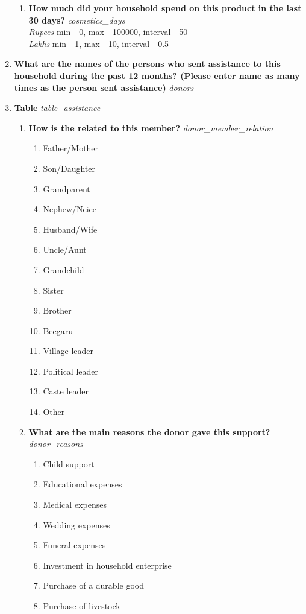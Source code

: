 \documentclass{article}
\begin{document}
\begin{enumerate}
\begin{enumerate}[label*=\arabic*.]
\item {\bfseries How much did your household spend on this product in the last 30 days?}\emph{ cosmetics\_days }
\\ \emph{ Rupees }min - 0, max - 100000, interval - 50
\\ \emph{ Lakhs }min - 1, max - 10, interval - 0.5

\end{enumerate}
\item {\bfseries What are the names of the persons who sent assistance to this household during the past 12 months? (Please enter name as many times as the person sent assistance)}\emph{ donors }

\item {\bfseries Table}\emph{ table\_assistance }
\begin{enumerate}[label*=\arabic*.]
\item {\bfseries How is the related to this member?}\emph{ donor\_member\_relation }
\begin{enumerate}
\item Father/Mother
\item Son/Daughter
\item Grandparent
\item Nephew/Neice
\item Husband/Wife
\item Uncle/Aunt
\item Grandchild
\item Sister
\item Brother
\item Beegaru
\item Village leader
\item Political leader
\item Caste leader
\item Other
\end{enumerate}
\item {\bfseries What are the main reasons the donor gave this support?}\emph{ donor\_reasons }
\begin{enumerate}
\item Child support
\item Educational expenses
\item Medical expenses
\item Wedding expenses
\item Funeral expenses
\item Investment in household enterprise
\item Purchase of a durable good
\item Purchase of livestock

\end{enumerate}
\end{enumerate}
\end{enumerate}
\end{document}
